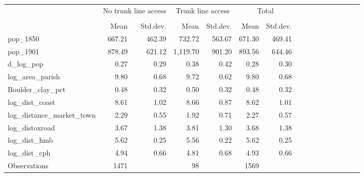 {
\def\sym#1{\ifmmode^{#1}\else\(^{#1}\)\fi}
\begin{tabular}{l*{3}{rrrrr}}
\toprule
                    &\multicolumn{2}{c}{No trunk line access}&\multicolumn{2}{c}{Trunk line access}&\multicolumn{2}{c}{Total}\\\cmidrule(lr){2-3}\cmidrule(lr){4-5}\cmidrule(lr){6-7}
                    &\multicolumn{2}{c}{}     &\multicolumn{2}{c}{}     &\multicolumn{2}{c}{}     \\
                    &        Mean&    Std.dev.&        Mean&    Std.dev.&        Mean&    Std.dev.\\
\midrule
pop\_1850            &      667.21&      462.39&      732.72&      563.67&      671.30&      469.41\\
pop\_1901            &      878.49&      621.12&    1,119.70&      901.20&      893.56&      644.46\\
d\_log\_pop           &        0.27&        0.29&        0.38&        0.42&        0.28&        0.30\\
log\_area\_parish     &        9.80&        0.68&        9.72&        0.62&        9.80&        0.68\\
Boulder\_clay\_pct    &        0.48&        0.32&        0.50&        0.32&        0.48&        0.32\\
log\_dist\_coast      &        8.61&        1.02&        8.66&        0.87&        8.62&        1.01\\
log\_distance\_market\_town&        2.29&        0.55&        1.92&        0.71&        2.27&        0.57\\
log\_distoxroad      &        3.67&        1.38&        3.81&        1.30&        3.68&        1.38\\
log\_dist\_hmb        &        5.62&        0.25&        5.56&        0.22&        5.62&        0.25\\
log\_dist\_cph        &        4.94&        0.66&        4.81&        0.68&        4.93&        0.66\\
\midrule
Observations        &        1471&            &          98&            &        1569&            \\
\bottomrule
\end{tabular}
}
